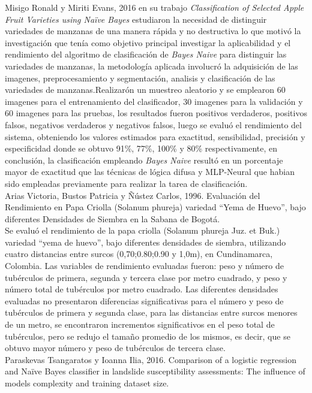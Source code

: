 Misigo Ronald y Miriti Evans, 2016 en su trabajo  \textit{Classification of Selected Apple Fruit Varieties using Naïve Bayes} estudiaron la necesidad de distinguir variedades de manzanas de una manera rápida y no destructiva lo que motivó la investigación  que tenía como objetivo principal investigar la aplicabilidad y el rendimiento del algoritmo de clasificación de \textit{Bayes Naive} para distinguir las variedades de manzanas, la metodología aplicada involucró la adquisición de las imagenes, preprocesamiento y segmentación, analisis y clasificación de las variedades de manzanas.Realizarón un muestreo aleatorio y se emplearon 60 imagenes para el entrenamiento del clasificador, 30 imagenes para la validación y 60 imagenes para las pruebas, los resultados fueron positivos verdaderos, positivos falsos, negativos verdaderos y negativos falsos, luego se evaluó el rendimiento del sistema, obteniendo los valores estimados para exactitud, sensibilidad, precisión y especificidad donde se obtuvo 91\%, 77\%, 100\% y 80\% respectivamente, en conclusión, la clasificación empleando \textit{Bayes Naive} resultó en un porcentaje mayor de exactitud que las técnicas de lógica difusa y MLP-Neural que habian sido empleadas previamente para realizar la tarea de clasificación.\\

Arias Victoria, Bustos Patricia y Ñústez Carlos, 1996. Evaluación del Rendimiento en Papa Criolla (Solanum phureja) variedad "`Yema de Huevo"', bajo diferentes Densidades de Siembra en la Sabana de Bogotá.\\

Se evaluó el rendimiento de la papa criolla (Solanum phureja Juz. et Buk.) variedad "`yema de huevo"', bajo diferentes densidades de siembra, utilizando cuatro distancias entre surcos (0,70;0.80;0.90 y 1,0m), en Cundinamarca, Colombia. Las variables de rendimiento evaluadas fueron: peso y número de tubérculos de primera, segunda y tercera clase por metro cuadrado, y peso y número total de tubérculos por metro cuadrado. Las diferentes densidades evaluadas no presentaron diferencias significativas para el número y peso de tubérculos de primera y segunda clase, para las distancias entre surcos menores de un metro, se encontraron incrementos significativos en el peso total de tubérculos, pero se redujo el tamaño promedio de los mismos, es decir, que se obtuvo mayor número y peso de tubérculos de tercera clase.\\

 Paraskevas Tsangaratos y Ioanna Ilia, 2016. Comparison of a logistic regression and Naïve Bayes classifier in landslide susceptibility assessments: The influence of models complexity and training dataset size.\\

